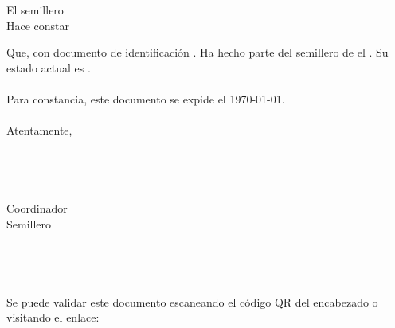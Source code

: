 \documentclass[12pt]{report}
\begin{document}
{\myfont
\vspace{3.3 cm}
\begin{center}
\begin{minipage}{0.8\textwidth}
\begin{center}
El semillero \textbf{\hotbed}\\
\vspace{1.0 cm}
Hace constar
\end{center}

Que, \textbf{\member}\xspace con documento de identificación \textbf{\identity}. Ha hecho parte del semillero de el \inicio. Su estado actual es \estado.\\\\

Para constancia, este documento se expide el \today.\\\\

Atentamente,\\\\\\\\

\textbf{\leader}\\
Coordinador\\
Semillero \hotbed\\
\resgroup
\\\\\\\\
{\footnotesize Se puede validar este documento escaneando el código QR del encabezado o visitando el enlace: \href{\web\code}{\web\code}}

\end{minipage}
\end{center}
}
\end{document}
